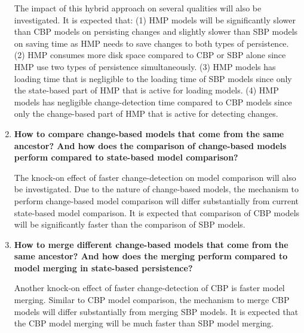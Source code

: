 \documentclass[12pt, a4paper]{report} \usepackage[titletoc]{appendix}
\begin{document}
\begin{enumerate}
	The impact of this hybrid approach on several qualities will also be investigated. It is expected that: (1) HMP models will be significantly slower than CBP models on persisting changes and slightly slower than SBP models on saving time as HMP needs to save changes to both types of persistence. (2) HMP consumes more disk space compared to CBP or SBP alone since HMP use two types of persistence simultaneously. (3) HMP models has loading time that is negligible to the loading time of SBP models since only the state-based part of HMP that is active for loading models. (4) HMP models has negligible change-detection time compared to CBP models since only the change-based part of HMP that is active for detecting changes.        
	
	\item \textbf{How to compare change-based models that come from the same ancestor? And how does the comparison of change-based models perform compared to state-based model comparison?} 
	
	The knock-on effect of faster change-detection on model comparison will also be investigated. Due to the nature of change-based models, the mechanism to perform change-based model comparison will differ substantially from current state-based model comparison. It is expected that comparison of CBP models will be significantly faster than the comparison of SBP models.   
	
	\item \textbf{How to merge different change-based models that come from the same ancestor? And how does the merging perform compared to model merging in state-based persistence?}
	
	Another knock-on effect of faster change-detection of CBP is faster model merging. Similar to CBP model comparison, the mechanism to merge CBP models will differ substantially from merging SBP models. It is expected that the CBP model merging will be much faster than SBP model merging.   
	
\end{enumerate}
\end{document}
